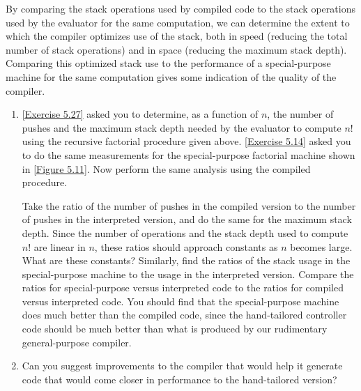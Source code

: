 \begin{exercise}
	\label{Exercise 5.45}
	By comparing the stack operations used by compiled code to the stack operations used by the evaluator for the same computation, we can determine the extent to which the compiler optimizes use of the stack, both in speed (reducing the total number of stack operations) and in space (reducing the maximum stack depth).
	Comparing this optimized stack use to the performance of a special-purpose machine for the same computation gives some indication of the quality of the compiler.
	\begin{enumerate}[label = \alph*., leftmargin = *]

		\item
			\cref{Exercise 5.27} asked you to determine, as a function of \( n \), the number of pushes and the maximum stack depth needed by the evaluator to compute \( n! \) using the recursive factorial procedure given above.
			\cref{Exercise 5.14} asked you to do the same measurements for the special-purpose factorial machine shown in \cref{Figure 5.11}.
			Now perform the same analysis using the compiled  procedure.

			Take the ratio of the number of pushes in the compiled version to the number of pushes in the interpreted version, and do the same for the maximum stack depth.
			Since the number of operations and the stack depth used to compute \( n! \)  are linear in \( n \), these ratios should approach constants as \( n \) becomes large.
			What are these constants?
			Similarly, find the ratios of the stack usage in the special-purpose machine to the usage in the interpreted version.
			Compare the ratios for special-purpose versus interpreted code to the ratios for compiled versus interpreted code.
			You should find that the special-purpose machine does much better than the compiled code, since the hand-tailored controller code should be much better than what is produced by our rudimentary general-purpose compiler.

		\item
			Can you suggest improvements to the compiler that would help it generate code that would come closer in performance to the hand-tailored version?

	\end{enumerate}
\end{exercise}



